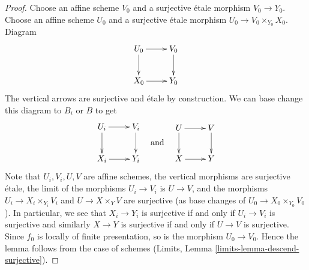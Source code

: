 \documentclass{stacks-project}
\theoremstyle{plain}
\theoremstyle{definition}
\theoremstyle{remark}
\numberwithin{equation}{subsection}
\begin{document}
\begin{proof}
Choose an affine scheme $V_0$ and a surjective \'etale morphism
$V_0 \to Y_0$. Choose an affine scheme $U_0$ and a surjective \'etale
morphism $U_0 \to V_0 \times_{Y_0} X_0$. Diagram
$$
\xymatrix{
U_0 \ar[d] \ar[r] & V_0 \ar[d] \\
X_0 \ar[r] & Y_0
}
$$
The vertical arrows are surjective and \'etale by construction.
We can base change this diagram to $B_i$ or $B$ to get
$$
\vcenter{
\xymatrix{
U_i \ar[d] \ar[r] & V_i \ar[d] \\
X_i \ar[r] & Y_i
}
}
\quad\text{and}\quad
\vcenter{
\xymatrix{
U \ar[d] \ar[r] & V \ar[d] \\
X \ar[r] & Y
}
}
$$
Note that $U_i, V_i, U, V$ are affine schemes, the vertical morphisms are
surjective \'etale, the limit of the morphisms $U_i \to V_i$ is $U \to V$,
and the morphisms $U_i \to X_i \times_{Y_i} V_i$ and
$U \to X \times_Y V$ are surjective (as base changes of
$U_0 \to X_0 \times_{Y_0} V_0$). In particular, we see that
$X_i \to Y_i$ is surjective if and only if $U_i \to V_i$ is surjective
and similarly $X \to Y$ is surjective if and only if $U \to V$ is surjective.
Since $f_0$ is locally of finite
presentation, so is the morphism $U_0 \to V_0$. Hence the lemma follows
from the case of schemes (Limits, Lemma \ref{limits-lemma-descend-surjective}).
\end{proof}
\end{document}
